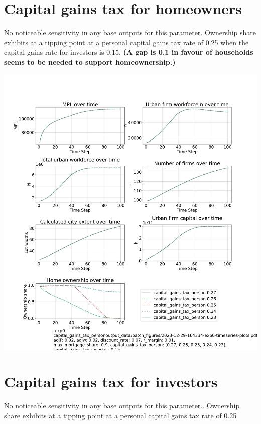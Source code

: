 \documentclass{article}
\begin{document}
\newpage %

\section{Capital gains tax for homeowners}
No noticeable sensitivity in any base outputs for this parameter. Ownership share exhibits at a tipping point at a personal capital gains tax rate of 0.25 when the capital gains rate for investors is 0.15. \textbf{(A gap is 0.1 in favour of households seems to be  needed to support homeownership.)}

\includegraphics[trim= 1.5cm 3.65cm 2cm 4.0cm, clip, scale=.28]{fig/Analysis/Capital-gains-person-point27-6-5-4-3.pdf}



\newpage %

\section{Capital gains tax for investors}
No noticeable sensitivity in any base outputs for this parameter.. Ownership share  exhibits at a tipping point at a personal capital gains tax rate of 0.25
\end{document}
